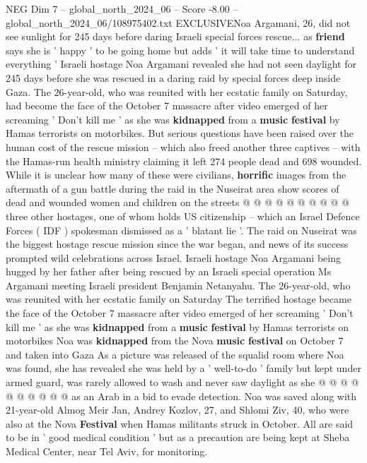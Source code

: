 \begin{textsample}{NEG Dim 7 – global\_north\_2024\_06 – Score -8.00 – global\_north\_2024\_06/108975402.txt}  \label{ex:f7_neg_138}
EXCLUSIVENoa Argamani, 26, did not see sunlight for 245 days before daring Israeli special forces rescue... as \textbf{friend} says she is ' happy ' to be going home but adds ' it will take time to understand everything ' Israeli hostage Noa Argamani revealed she had not seen daylight for 245 days before she was rescued in a daring raid by special forces deep inside Gaza.
The 26-year-old, who was reunited with her ecstatic family on Saturday, had become the face of the October 7 massacre after video emerged of her screaming ' Don't kill me ' as she was \textbf{kidnapped} from a \textbf{music} \textbf{festival} by Hamas terrorists on motorbikes.
But serious questions have been raised over the human cost of the rescue mission -- which also freed another three captives -- with the Hamas-run health ministry claiming it left 274 people dead and 698 wounded.
While it is unclear how many of these were civilians, \textbf{horrific} images from the aftermath of a gun battle during the raid in the Nuseirat area show scores of dead and wounded women and children on the streets @ @ @ @ @ @ @ @ @ @ three other hostages, one of whom holds US citizenship -- which an Israel Defence Forces ( IDF ) spokesman dismissed as a ' blatant lie '.
The raid on Nuseirat was the biggest hostage rescue mission since the war began, and news of its success prompted wild celebrations across Israel.
Israeli hostage Noa Argamani being hugged by her father after being rescued by an Israeli special operation Ms Argamani meeting Israeli president Benjamin Netanyahu.
The 26-year-old, who was reunited with her ecstatic family on Saturday The terrified hostage became the face of the October 7 massacre after video emerged of her screaming ' Don't kill me ' as she was \textbf{kidnapped} from a \textbf{music} \textbf{festival} by Hamas terrorists on motorbikes Noa was \textbf{kidnapped} from the Nova \textbf{music} \textbf{festival} on October 7 and taken into Gaza As a picture was released of the squalid room where Noa was found, she has revealed she was held by a ' well-to-do ' family but kept under armed guard, was rarely allowed to wash and never saw daylight as she @ @ @ @ @ @ @ @ @ @ as an Arab in a bid to evade detection.
Noa was saved along with 21-year-old Almog Meir Jan, Andrey Kozlov, 27, and Shlomi Ziv, 40, who were also at the Nova \textbf{Festival} when Hamas militants struck in October.
All are said to be in ' good medical condition ' but as a precaution are being kept at Sheba Medical Center, near Tel Aviv, for monitoring.

\end{textsample}

